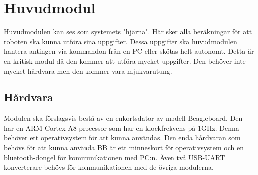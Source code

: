 \section{Huvudmodul}
Huvudmodulen kan ses som systemets "hjärna". Här sker alla beräkningar för att roboten ska kunna utföra sina uppgifter. Dessa uppgifter ska huvudmodulen hantera antingen via kommandon från en PC eller skötas helt autonomt. Detta är en kritisk modul då den kommer att utföra mycket uppgifter. Den behöver inte mycket hårdvara men den kommer vara mjukvarutung.
\subsection{Hårdvara}
Modulen ska förslagsvis bestå av en enkortsdator av modell Beagleboard. Den har en ARM Cortex-A8 processor som har en klockfrekvens på 1GHz. Denna behöver ett operativsystem för att kunna användas. Den enda hårdvaran som behövs för att kunna använda BB är ett minneskort för operativsystem och en bluetooth-dongel för kommunikationen med PC:n. Även två USB-UART konverterare behövs för kommunikationen med de övriga modulerna.
